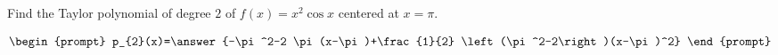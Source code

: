 \documentclass{ximera}
\author{Gregory Hartman \and Matthew Carr}
\begin{document}
\begin{exercise}





Find the Taylor polynomial of degree $2$ of $f(x)=x^2\cos x$ centered at $x=\pi$.

\[
\begin{prompt}
p_{2}(x)=\answer{-\pi^2-2 \pi  (x-\pi)+\frac{1}{2} \left(\pi ^2-2\right)(x-\pi)^2}
\end{prompt}
\]

\end{exercise}
\end{document}
